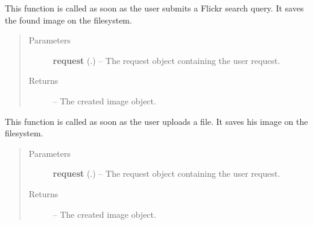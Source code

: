 \documentclass[letterpaper,10pt,english]{sphinxmanual}
\begin{document}
\begin{fulllineitems}
\label{Contour.contour:Contour.contour.views.handle_flickr_search}
This function is called as soon as the user submits a Flickr search query. It saves the found image on the filesystem.
\begin{quote}\begin{description}
\item[{Parameters}] \leavevmode
\textbf{request} (.) -- The request object containing the user request.

\item[{Returns}] \leavevmode
{} -- The created image object.

\end{description}\end{quote}

\end{fulllineitems}


\begin{fulllineitems}
\label{Contour.contour:Contour.contour.views.handle_uploaded_file}
This function is called as soon as the user uploads a file. It saves his image on the filesystem.
\begin{quote}\begin{description}
\item[{Parameters}] \leavevmode
\textbf{request} (.) -- The request object containing the user request.

\item[{Returns}] \leavevmode
{} -- The created image object.

\end{description}\end{quote}

\end{fulllineitems}

\end{document}
